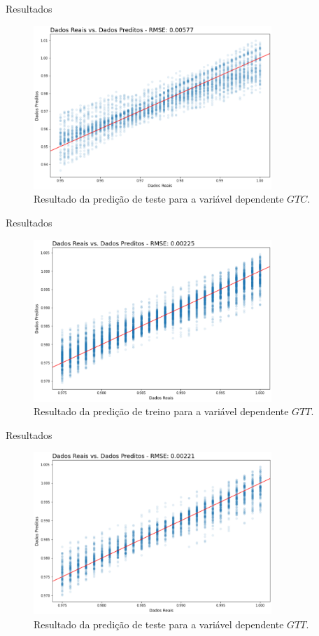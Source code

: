 \documentclass{beamer}
\theoremstyle{definition}
\begin{document}
\begin{frame}{Resultados}
\begin{figure}[h]
  \centering
  \includegraphics[width=9cm]{testeGT}
  \caption{Resultado da predição de teste para a variável dependente $GTC$.}
  \label{fig:testeGT}
\end{figure}
\end{frame}

\begin{frame}{Resultados}
\begin{figure}[h]
  \centering
  \includegraphics[width=9cm]{treinoGT1}
  \caption{Resultado da predição de treino para a variável dependente $GTT$.}
  \label{fig:treinoGT1}
\end{figure}
\end{frame}

\begin{frame}{Resultados}
\begin{figure}[h]
  \centering
  \includegraphics[width=9cm]{testeGT1}
  \caption{Resultado da predição de teste para a variável dependente $GTT$.}
  \label{fig:testeGT1}
\end{figure}
\end{frame}
\end{document}
